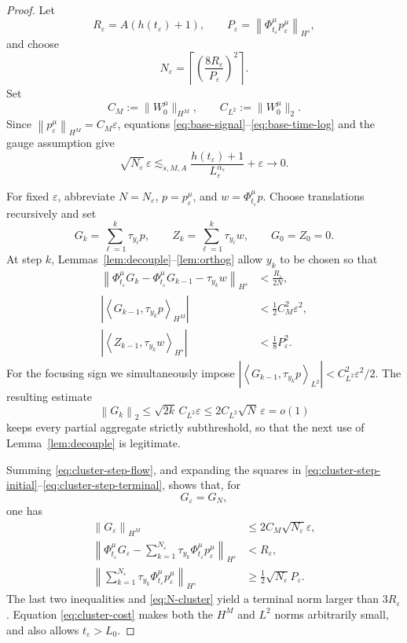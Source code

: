 \documentclass[11pt,reqno]{amsart}
\numberwithin{equation}{section}
\theoremstyle{remark}
\newcommand{\eps}{\varepsilon}
\newcommand{\norm}[1]{\left\lVert #1\right\rVert}
\newcommand{\abs}[1]{\left\lvert #1\right\rvert}
\newcommand{\ip}[2]{\left\langle #1,#2\right\rangle}
\newcommand{\flow}[1]{\Phi^{#1}}
\newcommand{\trans}[1]{\tau_{#1}}
\begin{document}
\begin{proof}
Let
\[
 R_\eps=A(h(t_\eps)+1),
 \qquad
 P_\eps=\norm{\flow\mu_{t_\eps}p_\eps^\mu}_{H^s},
\]
and choose
\begin{equation}\label{eq:N-cluster}
 N_\eps=\left\lceil
 \left(\frac{8R_\eps}{P_\eps}\right)^2
 \right\rceil.
\end{equation}
Set
\[
 C_M:=\|W_0^\mu\|_{H^M},\qquad C_{L^2}:=\|W_0^\mu\|_2.
\]
Since $\norm{p_\eps^\mu}_{H^M}=C_M\eps$, equations
\eqref{eq:base-signal}--\eqref{eq:base-time-log} and the gauge assumption give
\begin{equation}\label{eq:cluster-cost}
 \sqrt{N_\eps}\,\eps
 \lesssim_{s,M,A}
 \frac{h(t_\eps)+1}{L_\eps^{\alpha_s}}+\eps
 \longrightarrow0.
\end{equation}

For fixed $\eps$, abbreviate $N=N_\eps$, $p=p_\eps^\mu$, and
$w=\flow\mu_{t_\eps}p$.  Choose translations recursively and set
\[
 G_k=\sum_{\ell=1}^k\trans{y_\ell}p,\qquad
 Z_k=\sum_{\ell=1}^k\trans{y_\ell}w,\qquad G_0=Z_0=0.
\]
At step $k$, Lemmas~\ref{lem:decouple}--\ref{lem:orthog} allow $y_k$ to be
chosen so that
\begin{align}
 \norm{\flow\mu_{t_\eps}G_k-\flow\mu_{t_\eps}G_{k-1}
 -\trans{y_k}w}_{H^s}
 &<\frac{R_\eps}{2N},\label{eq:cluster-step-flow}\\
 \abs{\ip{G_{k-1}}{\trans{y_k}p}_{H^M}}
 &<\frac12 C_M^2\eps^2,\label{eq:cluster-step-initial}\\
 \abs{\ip{Z_{k-1}}{\trans{y_k}w}_{H^s}}
 &<\frac18P_\eps^2.\label{eq:cluster-step-terminal}
\end{align}
For the focusing sign we simultaneously impose
$|\ip{G_{k-1}}{\trans{y_k}p}_{L^2}|<C_{L^2}^2\eps^2/2$.  The resulting estimate
\[
 \norm{G_k}_2\leq\sqrt{2k}\,C_{L^2}\eps
 \leq2C_{L^2}\sqrt N\,\eps=o(1)
\]
keeps every partial aggregate strictly subthreshold, so that the next use of
Lemma~\ref{lem:decouple} is legitimate.

Summing \eqref{eq:cluster-step-flow}, and expanding the squares in
\eqref{eq:cluster-step-initial}--\eqref{eq:cluster-step-terminal}, shows that,
for
\begin{equation}\label{eq:G-cluster}
 G_\eps=G_N,
\end{equation}
one has
\begin{align}
 \norm{G_\eps}_{H^M}
 &\leq2C_M\sqrt{N_\eps}\eps,
 \label{eq:G-small}\\
 \norm{\flow\mu_{t_\eps}G_\eps-
 \sum_{k=1}^{N_\eps}\trans{y_k}
 \flow\mu_{t_\eps}p_\eps^\mu}_{H^s}
 &<R_\eps,\label{eq:G-flow-error}\\
 \norm{\sum_{k=1}^{N_\eps}\trans{y_k}
 \flow\mu_{t_\eps}p_\eps^\mu}_{H^s}
 &\geq\frac12\sqrt{N_\eps}P_\eps.
 \label{eq:G-output-orthog}
\end{align}
The last two inequalities and \eqref{eq:N-cluster} yield a terminal norm
larger than $3R_\eps$.  Equation \eqref{eq:cluster-cost} makes both the
$H^M$ and $L^2$ norms arbitrarily small, and also allows $t_\eps>L_0$.


\end{proof}
\end{document}

